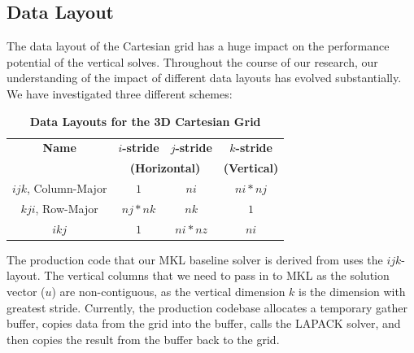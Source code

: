 \documentclass{sig-alternate-05-2015}
\begin{document}
\subsection{Data Layout}
\label{sec:implementation:data_layout}

The data layout of the Cartesian grid has a huge impact on the performance
  potential of the vertical solves.
Throughout the course of our research, our understanding of the impact of
  different data layouts has evolved substantially.
We have investigated three different schemes:
\begin{table}[h]
\centering
\caption{\textbf{Data Layouts for the 3D Cartesian Grid}}
\begin{tabular}[t]{|c|c|c|c|} \hline
\textbf{Name}         & \textbf{\(i\)-stride} & \textbf{\(j\)-stride} & \textbf{\(k\)-stride}   \\\cline{2-3}
                      & \multicolumn{2}{c|}{\textbf{(Horizontal)}}                 & \textbf{(Vertical)} \\ \hline
\(ijk\), Column-Major & \(1\)             & \(ni\)            & \(ni * nj\)         \\ \hline
\(kji\), Row-Major    & \(nj * nk\)       & \(nk\)            & \(1\)               \\ \hline
\(ikj\)               & \(1\)             & \(ni * nz\)       & \(ni\)              \\ \hline
\end{tabular}
\label{tab:implementation:data_layout:layouts}
\end{table}

The production code that our MKL baseline solver is derived from uses the
  \(ijk\)-layout.
The vertical columns that we need to pass in to MKL as the solution vector
  (\(u\)) are non-contiguous, as the vertical dimension \(k\) is the dimension
  with greatest stride.
Currently, the production codebase allocates a temporary gather buffer, copies
  data from the grid into the buffer, calls the LAPACK solver, and then copies
  the result from the buffer back to the grid.
\end{document}

